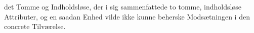 \documentclass[12pt,a4paper]{book}
\begin{document}
%
%
det Tomme og Indholdsløse, der i sig sammenfattede to tomme,
indholdsløse Attributer, og en saadan Enhed vilde ikke kunne
beherske Modsætningen i den concrete Tilværelse.
\end{document}
